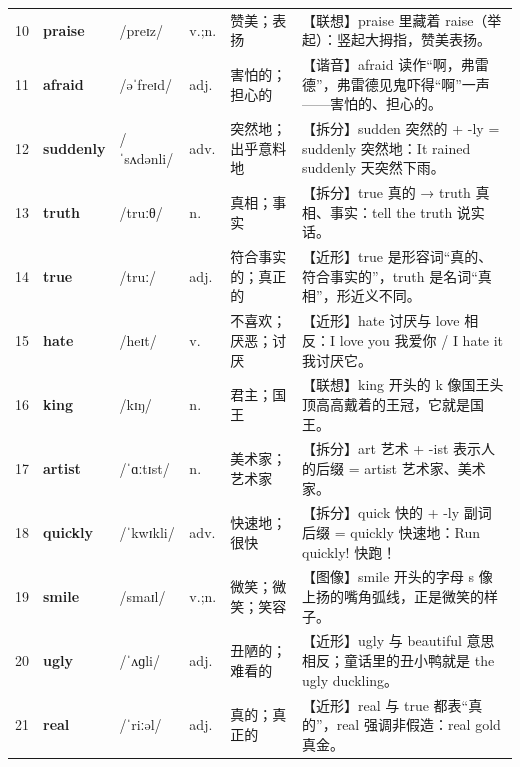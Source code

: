 \documentclass[UTF8,a4paper,11pt,oneside]{ctexbook}
\newcommand{\cellword}[1]{{\bfseries\textcolor{wordcol}{#1}}}
\newcommand{\cellipa}[1]{{\footnotesize\textcolor{ipacol}{#1}}}
\newcommand{\cellpos}[1]{\textcolor{poscol}{#1}}
\newcommand{\cellno}[1]{\textcolor{volcolor!75!black}{#1}}
\begin{document}
{\begin{longtable}{@{}C{0.045\textwidth}L{0.155\textwidth}L{0.175\textwidth}C{0.070\textwidth}L{0.180\textwidth}L{0.282\textwidth}@{}}
\cellno{10} & \cellword{praise} & \cellipa{/preɪz/} & \cellpos{v.;\allowbreak{}n.} & 赞美；表扬 & \textcolor{tagAssoc}{【联想】}praise 里藏着 raise（举起）：竖起大拇指，赞美表扬。 \\
 \cellno{11} & \cellword{afraid} & \cellipa{/əˈfreɪd/} & \cellpos{adj.} & 害怕的；担心的 & \textcolor{tagSound}{【谐音】}afraid 读作“啊，弗雷德”，弗雷德见鬼吓得“啊”一声——害怕的、担心的。 \\
\cellno{12} & \cellword{suddenly} & \cellipa{/ˈsʌdənli/} & \cellpos{adv.} & 突然地；出乎意料地 & \textcolor{tagSplit}{【拆分】}sudden 突然的 + -ly = suddenly 突然地：It rained suddenly 天突然下雨。 \\
 \cellno{13} & \cellword{truth} & \cellipa{/truːθ/} & \cellpos{n.} & 真相；事实 & \textcolor{tagSplit}{【拆分】}true 真的 →\allowbreak{} truth 真相、事实：tell the truth 说实话。 \\
\cellno{14} & \cellword{true} & \cellipa{/truː/} & \cellpos{adj.} & 符合事实的；真正的 & \textcolor{tagNear}{【近形】}true 是形容词“真的、符合事实的”，truth 是名词“真相”，形近义不同。 \\
 \cellno{15} & \cellword{hate} & \cellipa{/heɪt/} & \cellpos{v.} & 不喜欢；厌恶；讨厌 & \textcolor{tagNear}{【近形】}hate 讨厌与 love 相反：I love you 我爱你 / I hate it 我讨厌它。 \\
\cellno{16} & \cellword{king} & \cellipa{/kɪŋ/} & \cellpos{n.} & 君主；国王 & \textcolor{tagAssoc}{【联想】}king 开头的 k 像国王头顶高高戴着的王冠，它就是国王。 \\
 \cellno{17} & \cellword{artist} & \cellipa{/ˈɑːtɪst/} & \cellpos{n.} & 美术家；艺术家 & \textcolor{tagSplit}{【拆分】}art 艺术 + -ist 表示人的后缀 = artist 艺术家、美术家。 \\
\cellno{18} & \cellword{quickly} & \cellipa{/ˈkwɪkli/} & \cellpos{adv.} & 快速地；很快 & \textcolor{tagSplit}{【拆分】}quick 快的 + -ly 副词后缀 = quickly 快速地：Run quickly! 快跑！ \\
 \cellno{19} & \cellword{smile} & \cellipa{/smaɪl/} & \cellpos{v.;\allowbreak{}n.} & 微笑；微笑；笑容 & \textcolor{tagImage}{【图像】}smile 开头的字母 s 像上扬的嘴角弧线，正是微笑的样子。 \\
\cellno{20} & \cellword{ugly} & \cellipa{/ˈʌɡli/} & \cellpos{adj.} & 丑陋的；难看的 & \textcolor{tagNear}{【近形】}ugly 与 beautiful 意思相反；童话里的丑小鸭就是 the ugly duckling。 \\
 \cellno{21} & \cellword{real} & \cellipa{/ˈriːəl/} & \cellpos{adj.} & 真的；真正的 & \textcolor{tagNear}{【近形】}real 与 true 都表“真的”，real 强调非假造：real gold 真金。 \\

\end{longtable}}
\end{document}
